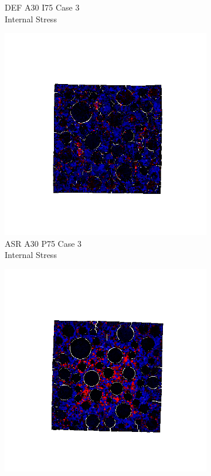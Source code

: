 \begin{figure}[ht]
\begin{subfigure}{.33\textwidth}
      \caption{DEF A30 I75 Case 3 \\ Internal Stress}
    \end{subfigure}
    \begin{subfigure}{.33\textwidth}
      \centering
      \includegraphics[width=1.0\linewidth]{Files/exp_3D/ASR/A30P75_3_stress.png}
      \caption{ASR A30 P75 Case 3 \\ Internal Stress}
    \end{subfigure}%
    \begin{subfigure}{.33\textwidth}
      \centering
      \includegraphics[width=1.0\linewidth]{Files/exp_3D/DEF/A30X0C_3_stress.png}

\end{subfigure}
\end{figure}
